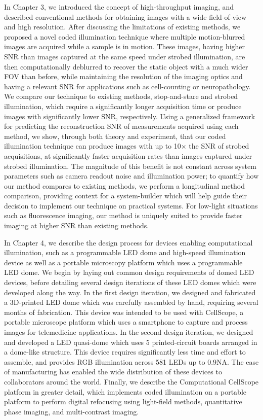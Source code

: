 In Chapter 3, we introduced the concept of high-throughput imaging, and described conventional methods for obtaining images with a wide field-of-view and high resolution. After discussing the limitations of existing methods, we proposed a novel coded illumination technique where multiple motion-blurred images are acquired while a sample is in motion. These images, having higher SNR than images captured at the same speed under strobed illumination, are then computationally deblurred to recover the static object with a much wider FOV than before, while maintaining the resolution of the imaging optics and having a relevant SNR for applications such as cell-counting or neuropathology. We compare our technique to existing methods, stop-and-stare and strobed illumination, which require a significantly longer acquisition time or produce images with significantly lower SNR, respectively. Using a generalized framework for predicting the reconstruction SNR of measurements acquired using each method, we show, through both theory and experiment, that our coded illumination technique can produce images with up to 10$\times$ the SNR of strobed acquisitions, at significantly faster acquisition rates than images captured under strobed illumination. The magnitude of this benefit is not constant across system parameters such as camera readout noise and illumination power; to quantify how our method compares to existing methods, we perform a longitudinal method comparison, providing context for a system-builder which will help guide their decision to implement our technique on practical systems. For low-light situations such as fluorescence imaging, our method is uniquely suited to provide faster imaging at higher SNR than existing methods.

In Chapter 4, we describe the design process for devices enabling computational illumination, such as a programmable LED dome and high-speed illumination device as well as a portable microscopy platform which uses a programmable LED dome. We begin by laying out common design requirements of domed LED devices, before detailing several design iterations of these LED domes which were developed along the way. In the first design iteration, we designed and fabricated a 3D-printed LED dome which was carefully assembled by hand, requiring several months of fabrication. This device was intended to be used with CellScope, a portable microscope platform which uses a smartphone to capture and process images for telemedicine applications. In the second design iteration, we designed and developed a LED quasi-dome which uses 5 printed-circuit boards arranged in a dome-like structure. This device requires significantly less time and effort to assemble, and provides RGB illumination across 581 LEDs up to 0.9NA. The ease of manufacturing has enabled the wide distribution of these devices to collaborators around the world. Finally, we describe the Computational CellScope platform in greater detail, which implements coded illumination on a portable platform to perform digital refocusing using light-field methods, quantitative phase imaging, and multi-contrast imaging.

